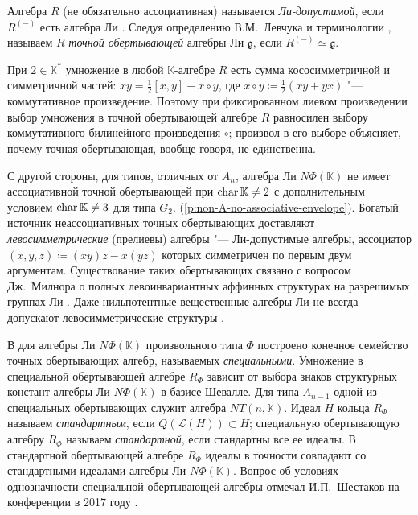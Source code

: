 Алгебра $R$ (не обязательно ассоциативная) называется \emph{Ли-допустимой},
если $R^{(-)}$ есть алгебра Ли \cite{albert48}. Следуя определению
В.\:М.~Левчука \cite{DAN2018} и терминологии \cite{imm2020}, называем $R$
\emph{точной обертывающей} алгебры Ли $\mathfrak{g}$, если
$R^{(-)}\simeq\mathfrak{g}$.

При $2\in\mathbb{K}^*$ умножение в любой $\mathbb{K}$-алгебре $R$ есть сумма
кососимметричной и симметричной частей: $xy=\frac12[x,y]+x\circ y$, где $x\circ
y\coloneq\frac12(xy+yx)$ "--- коммутативное произведение. Поэтому при
фиксированном лиевом произведении выбор умножения в точной обертывающей алгебре
$R$ равносилен выбору коммутативного билинейного произведения $\circ$; произвол
в его выборе объясняет, почему точная обертывающая, вообще говоря, не
единственна.

С другой стороны, для типов, отличных от $A_n$, алгебра Ли $N\Phi(\mathbb{K})$
не имеет ассоциативной точной обертывающей при $\operatorname{char}\mathbb{K}\neq2$ с
дополнительным условием $\operatorname{char}\mathbb{K}\neq3$ для типа
$G_2$\ifsynopsis.\else{} (\cref{p:non-A-no-associative-envelope}).\fi{} Богатый
источник неассоциативных точных обертывающих доставляют
\emph{левосимметрические} (прелиевы) алгебры "--- Ли-допустимые алгебры,
ассоциатор $(x,y,z)\coloneq(xy)z-x(yz)$ которых симметричен по первым двум
аргументам. Существование таких обертывающих связано с вопросом Дж.~Милнора о
полных левоинвариантных аффинных структурах на разрешимых группах Ли
\cite[\S~4]{milnor-left-sym}. Даже нильпотентные вещественные алгебры Ли не
всегда допускают левосимметрические структуры \cite{burde-counter-example}.

В \cite{DAN2018} для алгебры Ли $N\Phi(\mathbb{K})$ произвольного типа $\Phi$
построено конечное семейство точных обертывающих алгебр, называемых
\emph{специальными}. Умножение в специальной обертывающей алгебре $R_{\Phi}$
зависит от выбора знаков структурных констант алгебры Ли $N\Phi(\mathbb{K})$ в
базисе Шевалле. Для типа $A_{n-1}$ одной из специальных обертывающих служит
алгебра $NT(n,\mathbb{K})$. Идеал $H$ кольца $R_{\Phi}$ называем
\emph{стандартным}, если $Q(\mathcal{L}(H))\subset H$; специальную обертывающую
алгебру $R_{\Phi}$ называем \emph{стандартной}, если стандартны все ее идеалы.
В стандартной обертывающей алгебре $R_{\Phi}$ идеалы в точности совпадают со
стандартными идеалами алгебры Ли $N\Phi(\mathbb{K})$. Вопрос об условиях
однозначности специальной обертывающей алгебры отмечал И.\:П.~Шестаков на
конференции в 2017 году \cite{modernWorldConf2017}.

